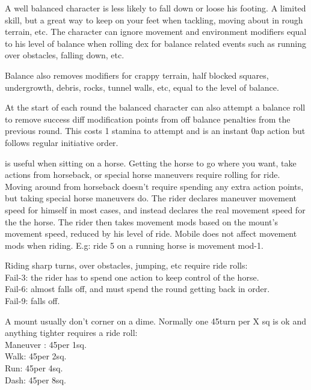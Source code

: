  A well balanced character is less likely to fall down or loose his footing. A limited skill, but a great way to keep on your feet when tackling, moving about in rough terrain, etc.
The character can ignore movement and environment modifiers equal to his level of balance when rolling dex for balance related events such as running over obstacles, falling down, etc.

Balance also removes modifiers for crappy terrain, half blocked squares, undergrowth, debris, rocks, tunnel walls, etc, equal to the level of balance.

At the start of each round the balanced character can also attempt a balance roll to remove success diff modification points from off balance penalties from the previous round. This costs 1 stamina to attempt and is an instant 0ap action but follows regular initiative order.


 is useful when sitting on a horse. Getting the horse to go where you want, take actions from horseback, or special horse maneuvers require rolling for ride. Moving around from horseback doesn't require spending any extra action points, but taking special horse maneuvers do. The rider declares maneuver movement speed for himself in most cases, and instead declares the real movement speed for the the horse. The rider then takes movement mods based on the mount's movement speed, reduced by his level of ride. Mobile does not affect movement mods when riding. E.g: ride 5 on a running horse is movement mod-1.

Riding sharp turns, over obstacles, jumping, etc require ride rolls:\\
Fail-3: the rider has to spend one action to keep control of the horse.\\
Fail-6: almost falls off, and must spend the round getting back in order.\\
Fail-9: falls off.

A mount usually don't corner on a dime. Normally one 45\degrees turn per X sq is ok and anything tighter requires a ride roll:\\
Maneuver : 45\degrees per 1sq.\\
Walk: 45\degrees per 2sq.\\
Run: 45\degrees per 4sq.\\
Dash: 45\degrees per 8sq.


